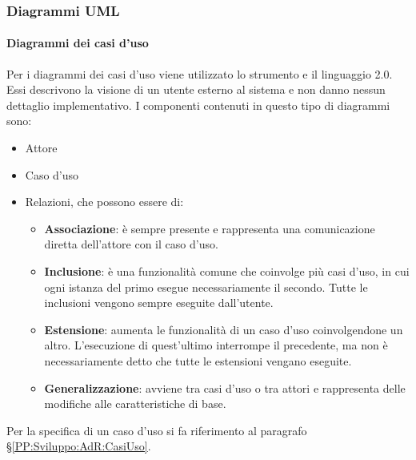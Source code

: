 		 
		\subsubsection{Diagrammi UML}\label{PP:Sviluppo:UML} %

		\paragraph{Diagrammi dei casi d'uso}\label{DiagrammiCasiUso}
		Per i diagrammi dei casi d'uso viene utilizzato lo strumento  e il linguaggio  2.0. Essi descrivono la visione di un utente esterno al sistema e non danno nessun dettaglio implementativo. I componenti contenuti in questo tipo di diagrammi sono:
		\begin{itemize}
			\item Attore
			\item Caso d'uso
			\item Relazioni, che possono essere di:
			\begin{itemize}
				\item \textbf{Associazione}: è sempre presente e rappresenta una comunicazione diretta dell'attore con il caso d'uso.
				\item \textbf{Inclusione}: è una funzionalità comune che coinvolge più casi d'uso, in cui ogni istanza del primo esegue necessariamente il secondo. Tutte le inclusioni vengono sempre eseguite dall'utente.
				\item \textbf{Estensione}: aumenta le funzionalità di un caso d'uso coinvolgendone un altro. L'esecuzione di quest'ultimo interrompe il precedente, ma non è necessariamente detto che tutte le estensioni vengano eseguite.
				\item \textbf{Generalizzazione}: avviene tra casi d'uso o tra attori e rappresenta delle modifiche alle caratteristiche di base.
			\end{itemize}
		\end{itemize}
		Per la specifica di un caso d'uso si fa riferimento al paragrafo \S\ref{PP:Sviluppo:AdR:CasiUso}.



